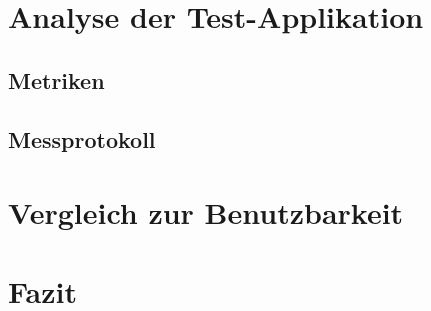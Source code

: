 \chapter{Analyse der Test-Applikation}
\section{Metriken}
\section{Messprotokoll}

\chapter{Vergleich zur Benutzbarkeit}

\chapter{Fazit}




\listoffigures %
\listoftables %

